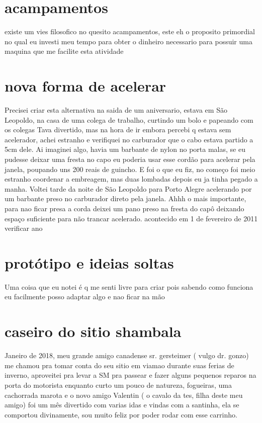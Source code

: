 \documentclass[a4paper]{report}
\begin{document}
\section*{acampamentos}
	existe um vies filosofico no quesito acampamentos, este eh o proposito primordial no qual eu investi meu tempo para obter o dinheiro necessario para possuir uma maquina que me facilite esta atividade


 

\section*{nova forma de acelerar}

Precisei criar esta alternativa na saida de um aniversario, estava em S\~ao Leopoldo, na casa de uma colega de trabalho, curtindo um bolo e papeando com os colegas
Tava divertido, mas na hora de ir embora percebi q estava sem acelerador, achei estranho e verifiquei no carburador que o cabo estava partido a 5cm dele.
Ai imaginei algo, havia um barbante de nylon no porta malas, se eu pudesse deixar uma fresta no capo eu poderia usar esse cord\~ao para acelerar pela janela, poupando uns 200 reais de guincho.
E foi o que eu fiz, no come\c{c}o foi meio estranho coordenar a embreagem, mas duas lombadas depois eu ja tinha pegado a manha.
Voltei tarde da noite de S\~ao Leopoldo para Porto Alegre acelerando por um barbante preso no carburador direto pela janela.
Ahhh o mais importante, para nao ficar presa a corda deixei um pano preso na fresta do cap\^o deixando espa\c{c}o suficiente para n\~ao trancar acelerado. 
acontecido em 1 de fevereiro de 2011 verificar ano


\section*{prot\'otipo e ideias soltas}
Uma coisa que eu notei \'e q me senti livre para criar pois sabendo como funciona eu facilmente posso adaptar algo e nao ficar na m\~ao


\section*{caseiro do sitio shambala}


Janeiro de 2018, meu grande amigo canadense sr. gersteimer ( vulgo dr. gonzo) me chamou pra tomar conta do seu sitio em viamao durante suas ferias de inverno, aproveitei pra levar a SM pra passear e fazer alguns pequenos reparos na porta do motorista enquanto curto um pouco de natureza, fogueiras, uma cachorrada marota e o novo amigo Valentin ( o cavalo da tes, filha deste meu amigo) foi um m\^es divertido com varias idas e vindas com a santinha, ela se comportou divinamente, sou muito feliz por poder rodar com esse carrinho. 
\end{document}
